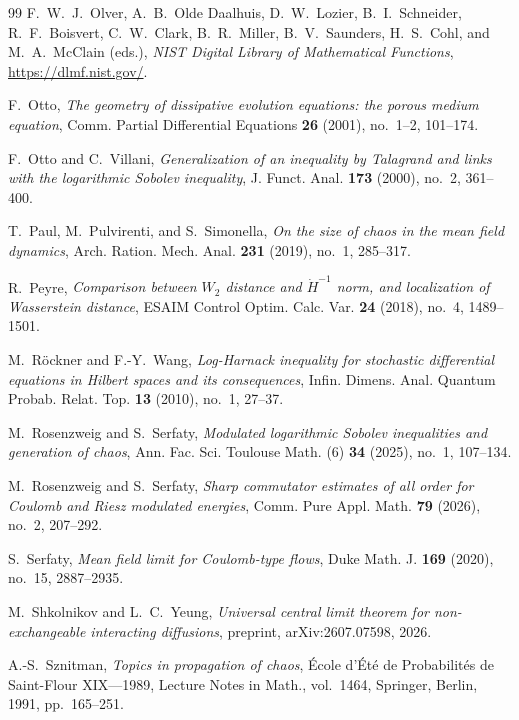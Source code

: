 \documentclass[11pt]{amsart}
\numberwithin{equation}{section}
\theoremstyle{plain}
\theoremstyle{remark}
\begin{document}
\begin{thebibliography}{99}
F.~W.~J.~Olver, A.~B.~Olde Daalhuis, D.~W.~Lozier, B.~I.~Schneider, R.~F.~Boisvert, C.~W.~Clark, B.~R.~Miller, B.~V.~Saunders, H.~S.~Cohl, and M.~A.~McClain (eds.), \emph{NIST Digital Library of Mathematical Functions}, \url{https://dlmf.nist.gov/}.

F.~Otto, \emph{The geometry of dissipative evolution equations: the porous medium equation}, Comm. Partial Differential Equations \textbf{26} (2001), no.~1--2, 101--174.

F.~Otto and C.~Villani, \emph{Generalization of an inequality by Talagrand and links with the logarithmic Sobolev inequality}, J. Funct. Anal. \textbf{173} (2000), no.~2, 361--400.

T.~Paul, M.~Pulvirenti, and S.~Simonella, \emph{On the size of chaos in the mean field dynamics}, Arch. Ration. Mech. Anal. \textbf{231} (2019), no.~1, 285--317.

R.~Peyre, \emph{Comparison between $W_2$ distance and $\dot H^{-1}$ norm, and localization of Wasserstein distance}, ESAIM Control Optim. Calc. Var. \textbf{24} (2018), no.~4, 1489--1501.

M.~R\"ockner and F.-Y.~Wang, \emph{Log-Harnack inequality for stochastic differential equations in Hilbert spaces and its consequences}, Infin. Dimens. Anal. Quantum Probab. Relat. Top. \textbf{13} (2010), no.~1, 27--37.

M.~Rosenzweig and S.~Serfaty, \emph{Modulated logarithmic Sobolev inequalities and generation of chaos}, Ann. Fac. Sci. Toulouse Math. (6) \textbf{34} (2025), no.~1, 107--134.

M.~Rosenzweig and S.~Serfaty, \emph{Sharp commutator estimates of all order for Coulomb and Riesz modulated energies}, Comm. Pure Appl. Math. \textbf{79} (2026), no.~2, 207--292.

S.~Serfaty, \emph{Mean field limit for Coulomb-type flows}, Duke Math. J. \textbf{169} (2020), no.~15, 2887--2935.

M.~Shkolnikov and L.~C.~Yeung, \emph{Universal central limit theorem for non-exchangeable interacting diffusions}, preprint, arXiv:2607.07598, 2026.

A.-S.~Sznitman, \emph{Topics in propagation of chaos}, \'Ecole d'\'Et\'e de Probabilit\'es de Saint-Flour XIX---1989, Lecture Notes in Math., vol.~1464, Springer, Berlin, 1991, pp.~165--251.


\end{thebibliography}
\end{document}
